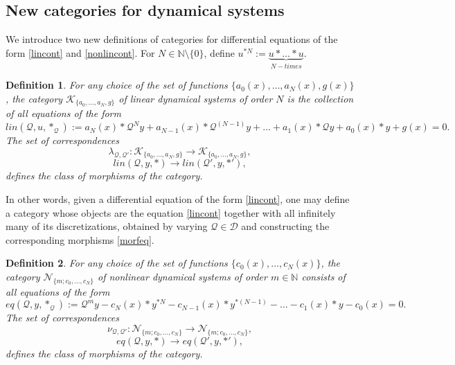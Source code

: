 \documentclass[10pt]{amsart}
\numberwithin{equation}{section}
\newtheorem{definition}{Definition}
\theoremstyle{definition}
\begin{document}
\subsection{New categories for dynamical systems}
\label{sec4.3}

We introduce two new definitions of categories for differential equations
of the form \eqref{lincont} and  \eqref{nonlincont}. For
$N\in \mathbb{N}\setminus \{0\}$, define
$u^{*N}:=\underbrace{u*\ldots *u}_{N-times}$.
\begin{definition}
\label{defn7}
For any choice of the set of functions
$\{a_{0}(x),\ldots ,a_{N}(x), g(x)\}$, the category
$\mathcal{K}_{\{ a_{0},\ldots , a_{N},g\}}$ of linear dynamical systems
of order $N$ is the collection of all equations of the form
\begin{equation}
lin(\mathcal{Q},u,*_{\mathcal{Q}}):=a_{N}(x)* \mathcal{Q}^{N} y + a_{N-1}(x)*
\mathcal{Q}^{(N-1)}y +\ldots + a_{1}(x)* \mathcal{Q} y+a_{0}(x)* y +g(x)=0.
\label{linabstr}
\end{equation}
 The set of correspondences
\begin{equation}
\lambda _{\mathcal{Q},\mathcal{Q}'}: \mathcal{K}_{\{ a_{0},\ldots , a_{N},g
\}} \longrightarrow \mathcal{K}_{\{ a_{0},\ldots , a_{N},g \}},
\label{eq4.6}
\end{equation}
\begin{equation}
lin(\mathcal{Q},y,*) \longrightarrow lin(\mathcal{Q}',y,*')
\label{morfeq},
\end{equation}
defines the class of morphisms of the category.
\end{definition}
In other words, given a differential equation of the form  \eqref{lincont}, one may define a category whose objects are the equation  \eqref{lincont} together with all infinitely many of its discretizations,
obtained by varying $\mathcal{Q}\in \mathcal{D}$ and constructing the corresponding
morphisms  \eqref{morfeq}.
\begin{definition}
\label{defn8}
For any choice of the set of functions
$\{c_{0}(x),\ldots ,c_{N}(x)\}$, the category
$\mathcal{N}_{\{m; c_{0},\ldots , c_{N}\}}$ of nonlinear dynamical systems
of order $m\in \mathbb{N}$ consists of all equations of the form
\begin{equation}
eq(\mathcal{Q},y,*_{\mathcal{Q}}):= \mathcal{Q}^{m} y- c_{N}(x)*y^{*N}-c_{N-1}(x)*y^{*(N-1)}-
\ldots -c_{1}(x)*y-c_{0}(x)=0.
\label{nonlinabstr}
\end{equation}
The set of correspondences
\begin{equation}
\nu _{\mathcal{Q},\mathcal{Q}'}: \mathcal{N}_{\{m; c_{0},\ldots , c_{N}
\}} \longrightarrow \mathcal{N}_{\{m; c_{0},\ldots , c_{N}\}},
\label{eq4.9}
\end{equation}
\begin{equation}
eq(\mathcal{Q},y,*) \longrightarrow eq(\mathcal{Q}',y,*')
\label{morfeqnlin},
\end{equation}
defines the class of morphisms of the category.
\end{definition}
\end{document}
